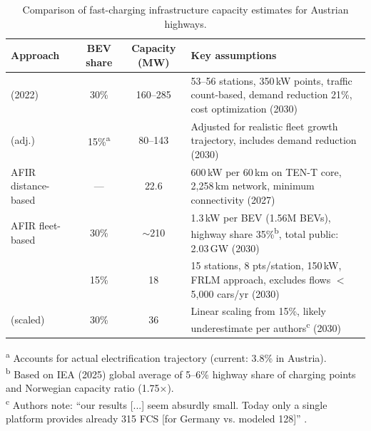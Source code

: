 \begin{table}[H]
\centering
\caption{Comparison of fast-charging infrastructure capacity estimates for Austrian highways.}
\label{tab:capacity_comparison}
\small
\begin{tabularx}{\textwidth}{@{}p{3.2cm}ccp{7.5cm}@{}}
\toprule
\textbf{Approach} & \textbf{\ac{BEV} share} & \textbf{Capacity (MW)} & \textbf{Key assumptions} \\
\midrule

\citet{en15062147} (2022) & 30\% & 160--285 &
53--56 stations, 350\,kW points, traffic count-based, demand reduction 21\%, cost optimization (2030) \\

\addlinespace

\citet{en15062147} (adj.) & 15\%\textsuperscript{a} & 80--143 &
Adjusted for realistic fleet growth trajectory, includes demand reduction (2030) \\

\addlinespace

AFIR distance-based & --- & 22.6 &
600\,kW per 60\,km on TEN-T core, 2{,}258\,km network, minimum connectivity (2027) \\

\addlinespace

AFIR fleet-based & 30\% & $\sim$210 &
1.3\,kW per \ac{BEV} (1.56M \acp{BEV}), highway share 35\%\textsuperscript{b}, total public: 2.03\,GW (2030) \\

\addlinespace

\citet{Jochem2019} & 15\% & 18 &
15 stations, 8 pts/station, 150\,kW, FRLM approach, excludes flows $<$5{,}000 cars/yr (2030) \\

\addlinespace

\citet{Jochem2019} (scaled) & 30\% & 36 &
Linear scaling from 15\%, likely underestimate per authors\textsuperscript{c} (2030) \\

\bottomrule
\end{tabularx}

\vspace{0.3cm}
\begin{minipage}{\textwidth}
\footnotesize
\textsuperscript{a} Accounts for actual electrification trajectory (current: 3.8\% in Austria). \\
\textsuperscript{b} Based on IEA (2025) global average of 5--6\% highway share of charging points and Norwegian capacity ratio (1.75×). \\
\textsuperscript{c} Authors note: ``our results [...] seem absurdly small. Today only a single platform provides already 315 FCS [for Germany vs. modeled 128]'' \citep[p.~126]{Jochem2019}.
\end{minipage}

\end{table}




